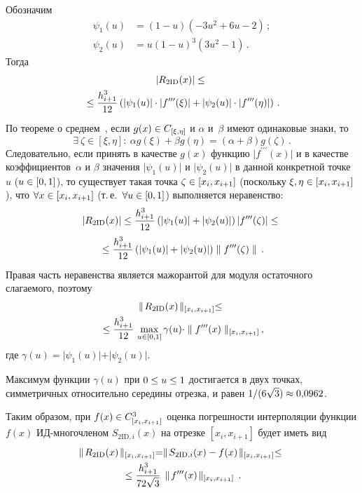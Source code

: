 \begin{multicols}{2}
  Обозначим 
  \begin{align*}
  \psi_1(u)  &= (1-u)(-3u^2 +6u -2)\,; \\
  \psi_2(u)&= u(1-u)^3(3u^2-1)\,.
  \end{align*}
   Тогда
  \begin{multline*}
  \vert R_{2\mathrm{ID}}(x)\vert \leq{}\\
  {}\leq \displaystyle\frac{\displaystyle h^3_{i+1}\mathstrut}{\displaystyle 12\mathstrut}\left(  \vert \psi_1(u)\vert\cdot \vert 
f^{\prime\prime\prime}(\xi)\vert+ \vert \psi_2(u)\vert\cdot \vert 
f^{\prime\prime\prime}(\eta)\vert \right)\,.
  \end{multline*}
По теореме о среднем~\cite{2-kir}, если $g(x)\hm\in C_{[\xi,\eta]}$ и $\alpha$ 
и~$\beta$ имеют одинаковые знаки, то 
$$
\exists\ \zeta \in [\xi,\eta]:\ \alpha 
g(\xi) +\beta g(\eta) = (\alpha+\beta) g(\zeta)\,.
$$
 Следовательно, если 
принять в качестве $g(x)$ функцию $\vert f^{\prime\prime\prime}(x)\vert$ и в 
качестве коэффициентов~$\alpha$ и $\beta$  значения $\vert\psi_1(u)\vert$ и 
$\vert\psi_2(u)\vert$ в данной конкретной точке~$u$ ($u\hm\in [0,1]$), то 
существует такая точка $\zeta\hm\in [x_i, x_{i+1}]$ (поскольку $\xi, \eta\hm\in 
[x_i,x_{i+1}]$), что $\forall x\hm\in [x_i,x_{i+1}]$ (т.\,е.\ $\forall u\hm\in [0,1]$) 
выполняется неравенство:
\begin{multline*}
\vert R_{2\mathrm{ID}}(x)\vert \leq \displaystyle\frac{\displaystyle h^3_{i+1}\mathstrut}{\displaystyle 12\mathstrut}\left( \vert \psi_1(u)\vert +\vert 
\psi_2(u)\vert \right) \vert f^{\prime\prime\prime}(\zeta)\vert \leq {}\\
{}\leq
\displaystyle\frac{\displaystyle h^3_{i+1}\mathstrut}{\displaystyle 12\mathstrut}\left(  \vert \psi_1(u)\vert +\vert \psi_2(u)\vert \right) \parallel 
f^{\prime\prime\prime}(\zeta)\parallel\,.
\end{multline*}
Правая часть неравенства является мажорантой для модуля остаточного 
слагаемого, поэтому
\begin{multline*}
\parallel\! R_{2\mathrm{ID}}(x) \!\parallel_{[x_i,x_{i+1}]} \leq {}\\
{}\leq
\displaystyle\frac{\displaystyle h^3_{i+1}\mathstrut}{\displaystyle 12\mathstrut}\,\max\limits_{u\in [0,1]} \gamma(u)\cdot \parallel 
f^{\prime\prime\prime}(x)\parallel_{[x_i,x_{i+1}]}\,,
\end{multline*}
где $\gamma(u) = 
\vert \psi_1(u)\vert +\vert \psi_2(u)\vert.$

  
  Максимум функции $\gamma(u)$ при $0\hm\leq u\hm\leq 1$ достигается в 
двух точках, симметричных относительно середины отрезка, и равен 
$1/(6\sqrt{3})\hm\approx 0{,}0962$.
  
  Таким образом, при $f(x)\hm\in C^3_{[x_i, x_{i+1}]}$ оценка погрешности 
интерполяции функции $f(x)$ ИД-мно\-го\-чле\-ном $S_{2\mathrm{ID},i}(x)$ на отрезке 
$[x_i, x_{i+1}]$ будет иметь вид
  \begin{multline*}
  \parallel \!R_{2\mathrm{ID}}(x)\!\parallel_{[x_i,x_{i+1}]} = \parallel \!S_{2\mathrm{ID},i}(x) -
f(x)\!\parallel_{[x_i,x_{i+1}]} \leq {}\\
{}\leq\displaystyle\frac{\displaystyle h^3_{i+1}\mathstrut}{\displaystyle 72\sqrt{3}\mathstrut}\,\parallel  \!
f^{\prime\prime\prime} (x)\!\parallel_{[x_i, x_{i+1}]}\,.
  \end{multline*}
  

\end{multicols}
